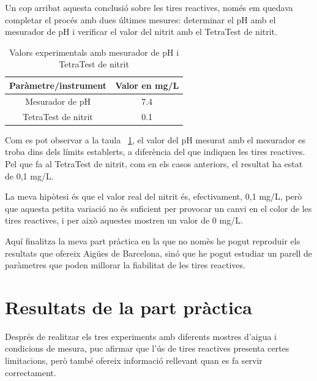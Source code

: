 Un cop arribat aquesta conclusió sobre les tires reactives, només em quedava completar el procés amb dues últimes mesures: determinar el pH amb el mesurador de pH i verificar el valor del nitrit amb el TetraTest de nitrit.
\begin{table}[H]
\centering
\begin{tabular}{|c|c|}
\hline
Paràmetre/instrument & Valor en mg/L \\
\hline
Mesurador de pH    & 7.4  \\
\hline
TetraTest de nitrit    & 0.1  \\
\hline
\end{tabular}%
\caption{Valors experimentals amb mesurador de pH i TetraTest de nitrit}
\label{tab:valors_tetra_pH}
\end{table}

Com es pot observar a la taula~ \ref{tab:valors_tetra_pH}, el valor del pH mesurat amb el mesurador es troba dins dels límits establerts, a diferència del que indiquen les tires reactives. Pel que fa al TetraTest de nitrit, com en els casos anteriors, el resultat ha estat de 0,1 mg/L.

La meva hipòtesi és que el valor real del nitrit és, efectivament, 0,1 mg/L, però que aquesta petita variació no és suficient per provocar un canvi en el color de les tires reactives, i per això aquestes mostren un valor de 0 mg/L.



Aquí finalitza la meva part pràctica en la que no nomès he pogut reproduir els resultats que ofereix Aigües de Barcelona, sinó que he pogut estudiar un parell de paràmetres que poden millorar la fiabilitat de les tires reactives.

\section{Resultats de la part pràctica} \label{s:resultats}
Després de realitzar els tres experiments amb diferents mostres d’aigua i condicions de mesura, puc afirmar que l’ús de tires reactives presenta certes limitacions, però també ofereix informació rellevant quan es fa servir correctament.

